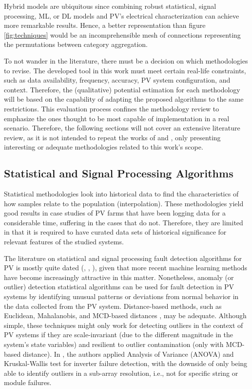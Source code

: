 Hybrid models are ubiquitous since combining robust statistical, signal processing, ML, or DL models and PV's electrical characterization can achieve more remarkable results. Hence, a better representation than figure \ref{fig:techniques} would be an incomprehensible mesh of connections representing the permutations between category aggregation.

To not wander in the literature, there must be a decision on which methodologies to revise. The developed tool in this work must meet certain real-life constraints, such as data availability, frequency, accuracy, PV system configuration, and context. Therefore, the (qualitative) potential estimation for each methodology will be based on the capability of adapting the proposed algorithms to the same restrictions. This evaluation process confines the methodology review to emphasize the ones thought to be most capable of implementation in a real scenario. Therefore, the following sections will not cover an extensive literature review, as it is not intended to repeat the works of \cite{Hong2022} and \cite{Livera2019}, only presenting interesting or adequate methodologies related to this work's scope.


\subsection{Statistical and Signal Processing Algorithms}

Statistical methodologies look into historical data to find the characteristics of how samples relate to the population (interpolation). These methodologies yield good results in case studies of PV farms that have been logging data for a considerable time, suffering in the cases that do not. Therefore, they are limited in that it is required to have curated data sets of historical significance for relevant features of the studied systems.

The literature on statistical and signal processing fault detection algorithms for PV is mostly quite dated (\cite{Buddha2012}, \cite{Zhao2014}, \cite{Vergura2008}), given that more recent machine learning methods have become increasingly attractive in this matter. Nonetheless, anomaly (or outlier) detection statistical algorithms can be used for fault detection in PV systems by identifying unusual patterns or deviations from normal behavior in the data collected from the PV system. Distance-based methods, such as Euclidean, Mahalanobis, and MCD-based distances \cite{Braun2011}, may be adequate. Although simple, these techniques might only work for detecting outliers in the context of PV systems if they are scale-invariant (due to the different magnitude in the system's state variables) and resilient to outlier contamination (only with MCD-based distance). In \cite{Vergura2008}, the authors applied Analysis of Variance (ANOVA) and Kruskal-Wallis test for inverter failure detection, with the downside of only being able to identify outliers in a sub-array resolution, i.e., not for specific string or module failures.

